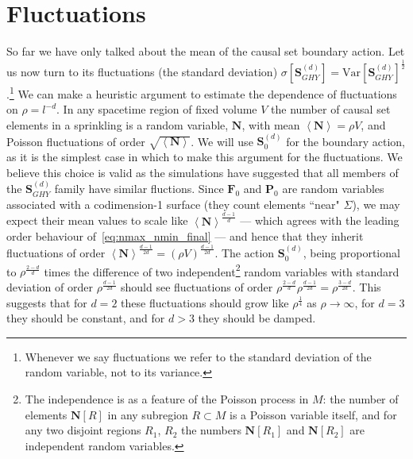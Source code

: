 \documentclass[12pt]{article}
\newcommand{\BF}[1]{\mathbf{F}_{#1}}
\newcommand{\BP}[1]{\mathbf{P}_{#1}}
\begin{document}
\section{Fluctuations}
So far we have only talked about the mean of the causal set boundary action. Let us now turn to its fluctuations (the standard deviation) $\sigma[\textbf{S}^{ (d)}_{GHY}]=\text{Var}[\textbf{S}^{ (d)}_{GHY}]^\frac12$.\footnote{Whenever we say fluctuations we refer to the standard deviation of the random variable, not to its variance.} We can make a heuristic argument to estimate the dependence of fluctuations on $\rho=l^{-d}$. In any spacetime region of fixed volume $V$ the number of causal set elements in a sprinkling is a random variable, $\textbf{N}$, with mean $\left\langle\textbf{N}\right\rangle=\rho V$, and Poisson fluctuations of order $\sqrt{\left\langle\textbf{N}\right\rangle}$. We will use $\textbf{S}^{ (d)}_{0}$ for the boundary action, as it is the simplest case in which to make this argument for the fluctuations. We believe this choice is valid as the simulations have suggested that all members of the $\textbf{S}^{ (d)}_{GHY}$ family have similar fluctions. Since $\BF{0}$ and $\BP{0}$ are random variables associated with a codimension-1 surface (they count elements ``near" $\Sigma$), we may expect their mean values to scale like $\left\langle\textbf{N}\right\rangle^\frac{d-1}{d}$ --- which agrees with the leading order behaviour of~\eqref{eq:nmax_nmin_final} --- and hence that they inherit fluctuations of order $\left\langle\textbf{N}\right\rangle^\frac{d-1}{2d} = (\rho V)^\frac{d-1}{2d}$. 
The action $\textbf{S}^{ (d)}_{0}$, being proportional to $\rho^\frac{2-d}{d}$ times the difference of two independent\footnote{The independence is as a feature of the Poisson process in $M$: the number of elements $\textbf{N}[R]$ in any subregion $R\subset M$ is a Poisson variable itself, and for any two disjoint regions $R_1$, $R_2$ the numbers $\textbf{N}[R_1]$ and $\textbf{N}[R_2]$ are independent random variables.} random variables with standard deviation of order $\rho^\frac{d-1}{2d}$  should see fluctuations of order $\rho^\frac{2-d}{d}\rho^\frac{d-1}{2d}=\rho^\frac{3-d}{2d}$. This suggests that for $d=2$ these fluctuations should grow like $\rho^{\frac{1}{4}}$ as $\rho\rightarrow\infty$, for $d=3$ they should be constant, and for $d>3$ they should be damped.
\end{document}
